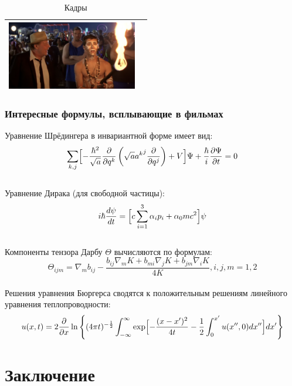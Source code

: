 \documentclass[10pt,a4paper]{report}
\begin{document}
\begin{table}[h!]
\begin{tabular}{  m{55mm} | m{55mm} }
\begin{minipage}{.3\textwidth}
    \end{minipage}
    \vspace{\baselineskip}
    \begin{minipage}{.3\textwidth}
      \includegraphics[height=30mm]{images/malcolm2.jpg}
    \end{minipage}
    \\
    \hline
  \end{tabular}
  \caption{Кадры}
  \label{table:2}
\end{table}

\subsection{Интересные формулы, всплывающие в фильмах}
Уравнение Шрёдингера в инвариантной форме имеет вид:\\
\[ \sum_{k,j} \Bigl[ -\frac{\hbar^2}{\sqrt{a}} \frac{\partial}{\partial q^k} \left( \sqrt{a}{a^k}^j \frac{\partial}{\partial q^j} \right) + V \Bigr]\Psi + \frac{\hbar}{i}\frac{\partial \Psi}{\partial t} = 0 \] \\
Уравнение Дирака (для свободной частицы):\\
\[i\hbar \frac{d\psi}{d t} = \Bigl[ c \sum_{i = 1}^3 \alpha_{i} p_{i} + \alpha_{0}m c^2\Bigr]\psi\]\\
Компоненты тензора Дарбу $\Theta$ вычисляются по формулам:\\
\[\Theta_{i j m} = \nabla_{m} b_{i j} - \frac{b_{i j}\nabla_{m}K + b_{mi}\nabla_{j}K + b_{j m}\nabla_{i}K}{4K}, i, j, m = 1, 2\]\\
Решения уравнения Бюргерса сводятся к положительным решениям линейного уравнения теплопроводности:\\
\[u(x, t) = 2\frac{\partial}{\partial x} \ln \left \{ (4\pi t)^{-\frac{1}{2}}\int_{-\infty}^\infty \exp \Bigl[ -\frac{(x - x^\prime)^2}{4t} - \frac{1}{2}\int_0^{x^\prime}u(x'', 0)dx''\Bigr]d x^\prime\right \}\]

\chapter{Заключение}
\end{document}
